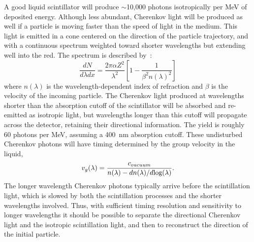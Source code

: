 \documentclass[aps,prc,twocolumn,groupedaddress,showpacs,amsmath,amssymb,floatfix,superscriptaddress]{revtex4}
\begin{document}
A good liquid scintillator will produce $\sim$10,000 photons
isotropically per MeV of deposited energy. Although less abundant,
Cherenkov light will be produced as well if a particle is moving faster
than the speed of light in the medium.  This light is emitted in a
cone centered on the direction of the particle trajectory, and with a
continuous spectrum weighted toward shorter wavelengths
but extending well into the red. The spectrum is described by~\cite{Cherenkov34}:
\begin{equation}
\label{eqCherenkov}
\frac{dN}{d\lambda dx} = \frac{2 \pi \alpha Z^2}{\lambda^2} \left [ 1 - \frac{1}{\beta^2 n(\lambda)^2} \right ]
\end{equation}
where $n(\lambda)$ is the wavelength-dependent index of refraction and
$\beta$ is the velocity of the incoming particle. The Cherenkov light
produced at wavelengths shorter than the absorption cutoff of the
scintillator will be absorbed and re-emitted as isotropic light, but
wavelengths longer than this cutoff will propagate across the
detector, retaining their directional information. The yield is
roughly 60 photons per MeV, assuming a 400~nm absorption
cutoff\cite{qdot}. These undisturbed Cherenkov photons will have timing
determined by the group velocity \cite{group_velocity_article} in the liquid,
\begin{equation}
\label{eqGroup}
v_{g}(\lambda) = \frac{c_{vacuum}}{n(\lambda) - dn(\lambda)/d\textnormal{log}(\lambda)}.
\end{equation}
The longer wavelength Cherenkov photons typically arrive before
the scintillation light, which is slowed by both the scintillation
processes and the shorter wavelengths involved. Thus, with sufficient
timing resolution and sensitivity to longer wavelengths it should be
possible to separate the directional Cherenkov light and the isotropic
scintillation light, and then to reconstruct the direction of the
initial particle.
\end{document}

